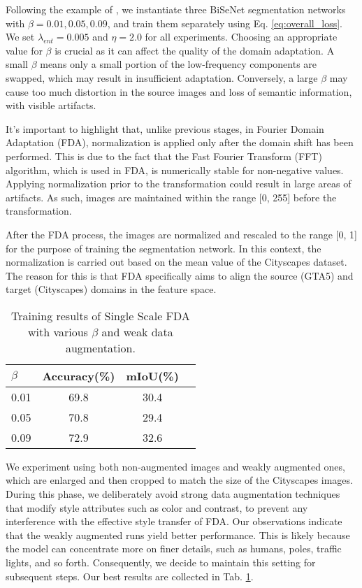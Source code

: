 \documentclass[10pt,twocolumn,letterpaper]{article}
\begin{document}
Following the example of \cite{fda}, we instantiate three BiSeNet segmentation networks with $\beta = 0.01, 0.05, 0.09$, and train them separately using Eq. \eqref{eq:overall_loss}. We set $\lambda_{ent} = 0.005$ and $\eta = 2.0$ for all experiments.
Choosing an appropriate value for $\beta$ is crucial as it can affect the quality of the domain adaptation. A small $\beta$ means only a small portion of the low-frequency components are swapped, which may result in insufficient adaptation. Conversely, a large $\beta$ may cause too much distortion in the source images and loss of semantic information, with visible artifacts.

It’s important to highlight that, unlike previous stages, in Fourier Domain Adaptation (FDA), normalization is applied only after the domain shift has been performed. This is due to the fact that the Fast Fourier Transform (FFT) algorithm, which is used in FDA, is numerically stable for non-negative values. Applying normalization prior to the transformation could result in large areas of artifacts. As such, images are maintained within the range [0, 255] before the transformation.

After the FDA process, the images are normalized and rescaled to the range [0, 1] for the purpose of training the segmentation network. In this context, the normalization is carried out based on the mean value of the Cityscapes dataset. The reason for this is that FDA specifically aims to align the source (GTA5) and target (Cityscapes) domains in the feature space.

\begin{table}[b]
    \centering
    \begin{tabular}{@{}lccc@{}}
    \toprule
    $\beta$ & Accuracy(\%) & mIoU(\%) \\
    \midrule
        0.01 & 69.8 & 30.4 \\
        0.05 & 70.8 & 29.4 \\
        0.09 & 72.9 & 32.6 \\
        \bottomrule
    \end{tabular}
    \caption{Training results of Single Scale FDA with various $\beta$ and weak data augmentation.}
    \label{tab:fda_single_scale}
\end{table}

We experiment using both non-augmented images and weakly augmented ones, which are enlarged and then cropped to match the size of the Cityscapes images. During this phase, we deliberately avoid strong data augmentation techniques that modify style attributes such as color and contrast, to prevent any interference with the effective style transfer of FDA.
Our observations indicate that the weakly augmented runs yield better performance. This is likely because the model can concentrate more on finer details, such as humans, poles, traffic lights, and so forth. Consequently, we decide to maintain this setting for subsequent steps. Our best results are collected in Tab. \ref{tab:fda_single_scale}.
\end{document}
